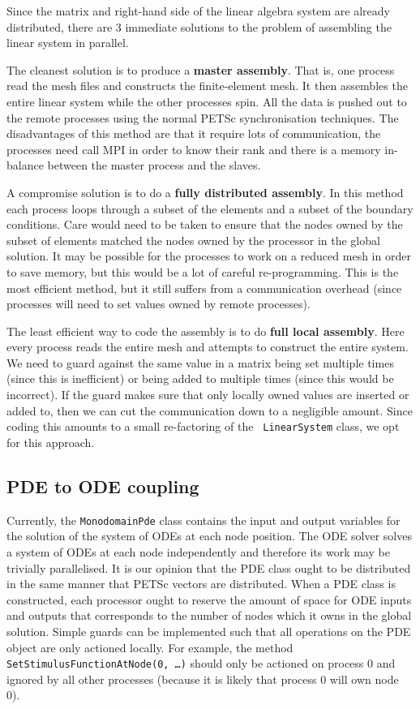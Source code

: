 \documentclass{article}
\begin{document}
Since the matrix and right-hand side of the linear algebra system are
already distributed, there are 3 immediate solutions to the problem of
assembling the linear system in parallel.

The cleanest solution is to produce a {\bf master assembly}.  That
is, one process read the mesh files and constructs the finite-element
mesh.  It then assembles the entire linear system while the other
processes spin.  All the data is pushed out to the remote processes
using the normal PETSc synchronisation techniques.   The disadvantages
of this method are that it require lots of communication, the
processes need call MPI in order to know their rank and there is a
memory in-balance between the master process and the slaves.

A compromise solution is to do a {\bf fully distributed assembly}.  In
this method each process loops through a subset of the elements and a
subset of the boundary conditions.  Care would need to be taken to
ensure that the nodes owned by the subset of elements matched the
nodes owned by the processor in the global solution.  It may be
possible for the processes to work on a reduced mesh in order to save
memory, but this would be a lot of careful re-programming.  This is
the most efficient method, but it still suffers from a communication
overhead (since processes will need to set values owned by remote
processes).

The least efficient way to code the assembly is to do {\bf full local
assembly}.  Here every process reads the entire mesh and attempts to
construct the entire system.  We need to guard against the same value
in a matrix being set multiple times (since this is inefficient) or
being added to multiple times (since this would be incorrect).
If the guard makes sure that only locally owned values are inserted or
added to, then we can cut the communication down to a negligible
amount.  Since coding this amounts to a small re-factoring of the {\tt
LinearSystem} class, we opt for this approach. 

\subsection{PDE to ODE coupling}
Currently, the {\tt MonodomainPde} class contains the input and output
variables for the solution of the system of ODEs at each node
position. The ODE solver solves a system of ODEs at each node
independently and therefore its work may be trivially parallelised. It
is our opinion that the PDE class ought to be distributed in the same
manner that PETSc vectors are distributed. When a PDE class is
constructed, each processor ought to reserve the amount of space
for ODE inputs and outputs that corresponds to the number of nodes
which it owns in the global solution. Simple guards can be implemented
such that all operations on the PDE object are only actioned
locally. For example, the method {\tt SetStimulusFunctionAtNode(0,
\ldots)} should only be actioned on process 0 and ignored by all other
processes (because it is likely that process 0 will own node 0).
\end{document}
